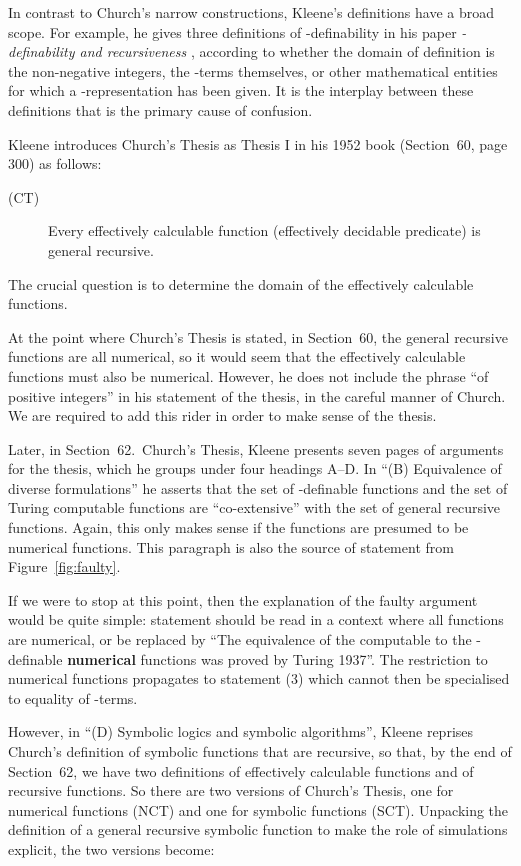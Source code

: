 \documentclass[a4paper]{article}
\begin{document}
In contrast to Church's narrow constructions, Kleene's definitions
have a broad scope. For example, he gives three definitions of
-definability in his paper {\em -definability and
  recursiveness} \cite{Kleene36}, according to whether the domain of
definition is the non-negative integers, the -terms themselves, or
other mathematical entities for which a -representation has
been given. It is the interplay between these definitions that is the
primary cause of confusion.

Kleene introduces Church's Thesis as Thesis I in his 1952 book 
(Section~60, page 300) as follows:

\begin{description}
\item[(CT)] Every effectively calculable function (effectively decidable predicate) is general recursive. 
\end{description}

\noindent
The crucial question is to determine the domain of the effectively
calculable functions.  

At the point where Church's Thesis is stated, in Section~60, the
general recursive functions are all numerical, so it would seem that
the effectively calculable functions must also be numerical.  However,
he does not include the phrase ``of positive integers'' in his
statement of the thesis, in the careful manner of Church. We are
required to add this rider in order to make sense of the thesis.

Later, in Section~62.\ Church's Thesis, Kleene presents seven pages of
arguments for the thesis, which he groups under four headings A--D.  In
``(B) Equivalence of diverse formulations'' he asserts that the set of
-definable functions and the set of Turing computable functions
are ``co-extensive'' with the set of general recursive functions.
Again, this only makes sense if the functions are presumed to be
numerical functions. This paragraph is also the source of statement
 from Figure~\ref{fig:faulty}.

If we were to stop at this point, then the explanation of the faulty
argument would be quite simple: statement  should be read in a
context where all functions are numerical, or be replaced by ``The
equivalence of the computable to the -definable {\bf numerical}
functions was proved by Turing 1937''. The restriction to numerical
functions propagates to statement (3) which cannot then be specialised
to equality of -terms. 

However, in ``(D) Symbolic logics and symbolic algorithms'', Kleene
reprises Church's definition of symbolic functions that are recursive,
so that, by the end of Section~62, we have two definitions of
effectively calculable functions and of recursive functions. So there
are two versions of Church's Thesis, one for numerical functions (NCT)
and one for symbolic functions (SCT).  Unpacking the definition of a
general recursive symbolic function to make the role of simulations
explicit, the two versions become:
\end{document}
